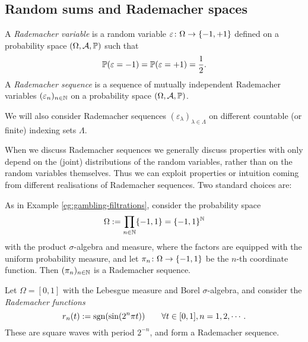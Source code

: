 \subsection{Random sums and Rademacher spaces}

\begin{defn}
  A \emph{Rademacher variable} is a random variable $\map{\varepsilon}{\Omega}{\{-1,+1\}}$ defined on a probability space $(\Omega,\mc{A},\P)$ such that
  \begin{equation*}
    \P(\varepsilon = -1) = \P(\varepsilon = +1) = \frac{1}{2}.
  \end{equation*}
  A \emph{Rademacher sequence} is a sequence of mutually independent Rademacher variables $(\varepsilon_{n})_{n \in \N}$ on a probability space $(\Omega,\mc{A},\P)$.
\end{defn}

\begin{rmk}
  We will also consider Rademacher sequences $(\varepsilon_{\lambda})_{\lambda \in \Lambda}$ on different countable (or finite) indexing sets $\Lambda$.
\end{rmk}

When we discuss Rademacher sequences we generally discuss properties with only depend on the (joint) distributions of the random variables, rather than on the random variables themselves.
Thus we can exploit properties or intuition coming from different realisations of Rademacher sequences.
Two standard choices are:

\begin{example}
  As in Example \ref{eg:gambling-filtrations}, consider the probability space
  \begin{equation*}
    \Omega := \prod_{n \in \N} \{-1,1\} = \{-1,1\}^{\N}
  \end{equation*}
  with the product $\sigma$-algebra and measure, where the factors are equipped with the uniform probability measure, and let $\map{\pi_{n}}{\Omega}{\{-1,1\}}$ be the $n$-th coordinate function.
  Then $(\pi_{n})_{n \in \N}$ is a Rademacher sequence.
\end{example}

\begin{example}
  Let $\Omega = [0,1]$ with the Lebesgue measure and Borel $\sigma$-algebra, and consider the \emph{Rademacher functions}
  \begin{equation*}
    r_n(t) := \sgn(\sin(2^n\pi t)) \qquad \forall t \in [0,1], n = 1,2,\cdots.
  \end{equation*}
  These are square waves with period $2^{-n}$, and form a Rademacher sequence.
\end{example}

